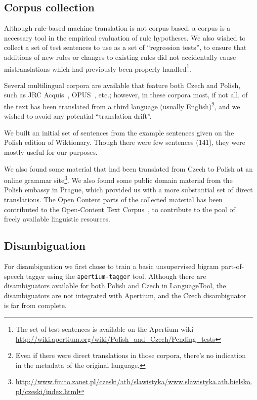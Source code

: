 \documentclass[11pt]{article}
\begin{document}
\subsection{Corpus collection}
\label{sect:corpus}

Although rule-based machine translation is not corpus based, a corpus is a 
necessary tool in the empirical evaluation of rule hypotheses. We also
wished to collect a set of test sentences to use as a set of ``regression 
tests'', to ensure that additions of new rules or changes to existing rules
did not accidentally cause mistranslations which had previously been
properly handled\footnote{The set of test sentences is available on the
Apertium wiki \url{http://wiki.apertium.org/wiki/Polish_and_Czech/Pending_tests}}.

Several multilingual corpora are available that feature both
Czech and Polish, such as JRC Acquis~\citep{Steinberger2006}, 
OPUS~\citep{Tiedemann2009}, etc.; however, in these corpora
most, if not all, of the text has been translated from a third language
(usually English)\footnote{Even if there were direct translations in those 
corpora, there's no indication in the metadata of the original language.}, 
and we wished to avoid any potential ``translation drift''.

We built an initial set of sentences from the example sentences given on
the Polish edition of Wiktionary. Though there were few sentences (141), they
were mostly useful for our purposes.

We also found some material that had been translated from Czech to Polish
at an online grammar 
site\footnote{\url{http://www.finito.zanet.pl/czeski/ath/slawistyka/www.slawistyka.ath.bielsko.pl/czeski/index.html}}. 
We also found some public domain material from
the Polish embassy in Prague, which provided us with a more substantial 
set of direct translations. The Open Content parts of the collected
material has been contributed to the Open-Content Text Corpus~\citep{Banski10}, 
to contribute to the pool of freely available linguistic resources.

\subsection{Disambiguation}

For disambiguation we first chose to train a basic unsupervised bigram
part-of-speech tagger using the {\tt\small apertium-tagger} tool.
Although there are disambiguators available for both Polish and
Czech in LanguageTool, the disambiguators are not integrated with 
Apertium, and the Czech disambiguator is far from complete.
\end{document}
